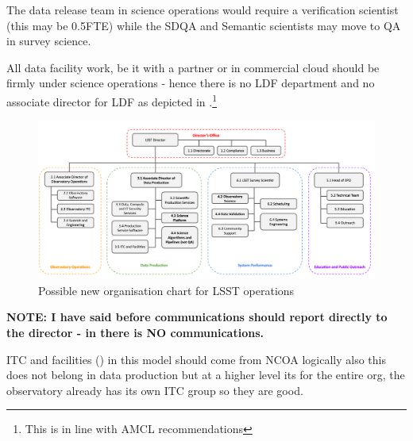 The data release team in science operations would require a verification scientist (this may be 0.5FTE) while the \gls{SDQA} and Semantic scientists may move to QA in survey science.

All data facility work, be it with a partner or in commercial \gls{cloud} should be firmly under science operations - hence there is no LDF department and no associate director for LDF as depicted in .\footnote{This is  in line with AMCL recommendations}


\begin{figure}
\includegraphics[width=1.0\textwidth]{figures/OpsOrg}
\caption{Possible new organisation chart for \gls{LSST}  operations \label{fig:opsorg}}
\end{figure}

\textbf{NOTE: I have said before communications should report directly to the director - in  there is NO communications.}

ITC and facilities () in this model should come from NCOA  logically also this does not belong in data production but at a higher level its for the entire org, the observatory already has its own ITC group so they are good.

